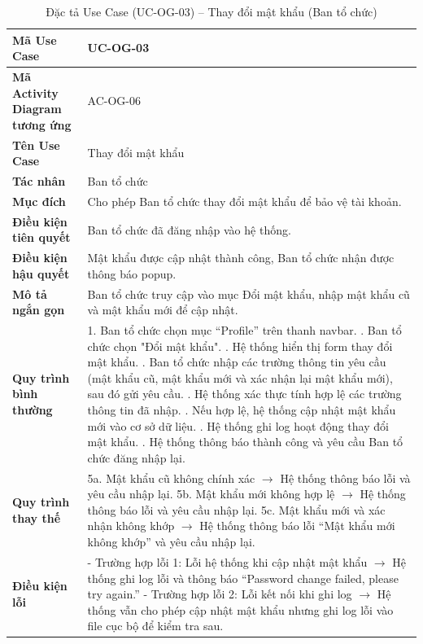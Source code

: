 \renewcommand{\arraystretch}{1.3}
\setlength{\tabcolsep}{4pt}
\begin{longtable}{|p{}|p{}|}
\caption{Đặc tả Use Case (UC-OG-03) -- Thay đổi mật khẩu (Ban tổ chức) }\label{tab:uc_change_password}\\
\hline
\textbf{Mã Use Case} & UC-OG-03 \\ \hline
\textbf{Mã Activity Diagram tương ứng} & AC-OG-06 \\ \hline
\textbf{Tên Use Case} & Thay đổi mật khẩu \\ \hline
\textbf{Tác nhân} & Ban tổ chức \\ \hline
\textbf{Mục đích} & Cho phép Ban tổ chức thay đổi mật khẩu để bảo vệ tài khoản. \\ \hline
\textbf{Điều kiện tiên quyết} & Ban tổ chức đã đăng nhập vào hệ thống. \\ \hline
\textbf{Điều kiện hậu quyết} & Mật khẩu được cập nhật thành công, Ban tổ chức nhận được thông báo popup. \\ \hline
\textbf{Mô tả ngắn gọn} & Ban tổ chức truy cập vào mục Đổi mật khẩu, nhập mật khẩu cũ và mật khẩu mới để cập nhật. \\ \hline
\textbf{Quy trình bình thường} &
1. Ban tổ chức chọn mục “Profile” trên thanh navbar. \newline
2. Ban tổ chức chọn "Đổi mật khẩu". \newline
3. Hệ thống hiển thị form thay đổi mật khẩu. \newline
4. Ban tổ chức nhập các trường thông tin yêu cầu (mật khẩu cũ, mật khẩu mới và xác nhận lại mật khẩu mới), sau đó gửi yêu cầu. \newline
5. Hệ thống xác thực tính hợp lệ các trường thông tin đã nhập. \newline
6. Nếu hợp lệ, hệ thống cập nhật mật khẩu mới vào cơ sở dữ liệu. \newline
7. Hệ thống ghi log hoạt động thay đổi mật khẩu. \newline
8. Hệ thống thông báo thành công và yêu cầu Ban tổ chức đăng nhập lại. \\ \hline
\textbf{Quy trình thay thế} &
5a. Mật khẩu cũ không chính xác $\rightarrow$ Hệ thống thông báo lỗi và yêu cầu nhập lại. \newline
5b. Mật khẩu mới không hợp lệ $\rightarrow$ Hệ thống thông báo lỗi và yêu cầu nhập lại. \newline
5c. Mật khẩu mới và xác nhận không khớp $\rightarrow$ Hệ thống thông báo lỗi “Mật khẩu mới không khớp” và yêu cầu nhập lại. \\ \hline
\textbf{Điều kiện lỗi} &    
- Trường hợp lỗi 1: Lỗi hệ thống khi cập nhật mật khẩu $\rightarrow$ Hệ thống ghi log lỗi và thông báo “Password change failed, please try again.” \newline
- Trường hợp lỗi 2: Lỗi kết nối khi ghi log $\rightarrow$ Hệ thống vẫn cho phép cập nhật mật khẩu nhưng ghi log lỗi vào file cục bộ để kiểm tra sau. \\ \hline
\end{longtable}

